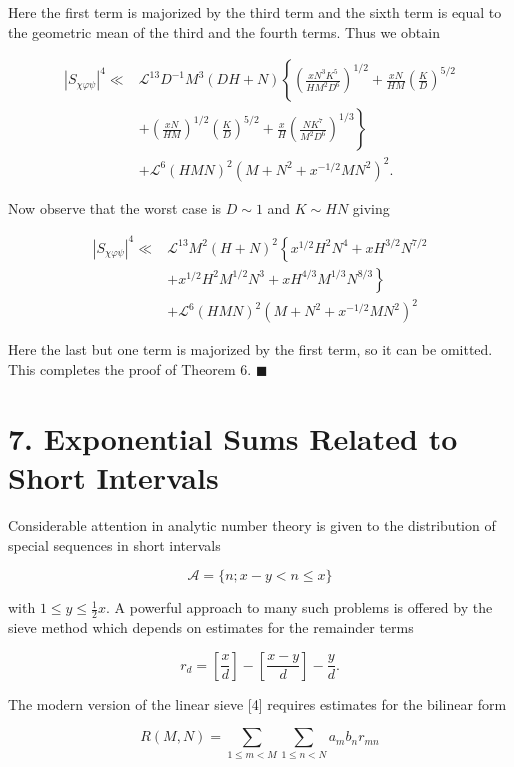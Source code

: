 \documentclass[10pt]{article}
\newcommand{\proofend}{\hfill\(\blacksquare\)}
\begin{document}
Here the first term is majorized by the third term and the sixth term is equal to the geometric mean of the third and the fourth terms. Thus we obtain

$$
\begin{aligned}
\left|S_{\chi\varphi\psi}\right|^{4}\ll & \mathscr{L}^{13} D^{-1} M^{3}(D H+N)\left\{\left(\frac{x N^{3} K^{5}}{H M^{2} D^{6}}\right)^{1 / 2}+\frac{x N}{H M}\left(\frac{K}{D}\right)^{5 / 2}\right. \\
& \left.+\left(\frac{x N}{H M}\right)^{1 / 2}\left(\frac{K}{D}\right)^{5 / 2}+\frac{x}{H}\left(\frac{N K^{7}}{M^{2} D^{6}}\right)^{1 / 3}\right\} \\
& +\mathscr{L}^{6}(H M N)^{2}\left(M+N^{2}+x^{-1 / 2} M N^{2}\right)^{2} .
\end{aligned}
$$

Now observe that the worst case is $D \sim 1$ and $K \sim H N$ giving

$$
\begin{aligned}
\left|S_{\chi\varphi\psi}\right|^{4} \ll & \mathscr{L}^{13} M^{2}(H+N)^{2}\left\{x^{1 / 2} H^{2} N^{4}+x H^{3 / 2} N^{7 / 2}\right. \\
& \left.+x^{1 / 2} H^{2} M^{1 / 2} N^{3}+x H^{4 / 3} M^{1 / 3} N^{8 / 3}\right\} \\
& +\mathscr{L}^{6}(H M N)^{2}\left(M+N^{2}+x^{-1 / 2} M N^{2}\right)^{2}
\end{aligned}
$$

Here the last but one term is majorized by the first term, so it can be omitted. This completes the proof of Theorem 6. \proofend

\section*{7. Exponential Sums Related to Short Intervals}
Considerable attention in analytic number theory is given to the distribution of special sequences in short intervals

$$
\mathscr{A}=\{n ; x-y<n \leqslant x\}
$$

with $1 \leqslant y \leqslant \frac{1}{2} x$. A powerful approach to many such problems is offered by the sieve method which depends on estimates for the remainder terms

$$
r_{d}=\left[\frac{x}{d}\right]-\left[\frac{x-y}{d}\right]-\frac{y}{d} .
$$

The modern version of the linear sieve [4] requires estimates for the bilinear form


\begin{equation*}
R(M, N)=\sum_{1 \leqslant m<M} \sum_{1 \leqslant n<N} a_{m} b_{n} r_{m n} \tag{7.1}
\end{equation*}
\end{document}
